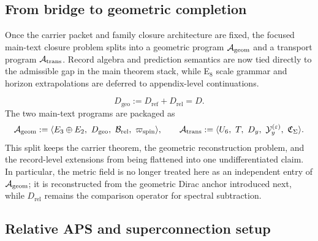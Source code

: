 
\subsection{From bridge to geometric completion}

\begin{principle}
Once the carrier packet and family closure architecture are fixed, the focused main-text closure
problem splits into a geometric program $\mathcal A_{\mathrm{geom}}$ and a transport program $\mathcal A_{\mathrm{trans}}$. Record
algebra and prediction semantics are now tied directly to the admissible gap in the main theorem
stack, while E$_8$ scale grammar and horizon extrapolations are deferred to appendix-level
continuations.
\end{principle}

\[
D_{\mathrm{geo}}:=D_{\mathrm{ref}}+D_{\mathrm{rel}}=D.
\]
The two main-text programs are packaged as
\[
\Ageom
:=
\langle E_3\oplus E_2,\ D_{\mathrm{geo}},\ \mathcal B_{\mathrm{rel}},\ \wspin\rangle,
\qquad
\Atrans
:=
\langle U_6,\ T,\ D_y,\ \mathcal Y_y^{(\varepsilon)},\ \Ccyc\rangle.
\]
This split keeps the carrier theorem, the geometric reconstruction problem, and the record-level extensions from being flattened into one undifferentiated claim. In particular, the metric field is no longer treated here as an independent entry of $\mathcal A_{\mathrm{geom}}$; it is reconstructed from the geometric Dirac anchor introduced next, while $D_{\mathrm{rel}}$ remains the comparison operator for spectral subtraction.

\subsection{Relative APS and superconnection setup}

